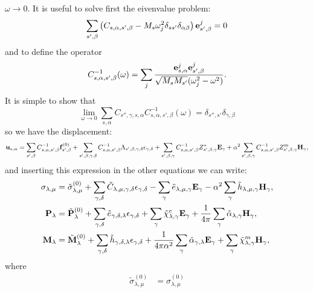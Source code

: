 \documentclass[12pt,a4paper]{article}
\begin{document}
{$\omega \rightarrow 0$.
It is useful to solve first the eivenvalue problem:
\begin{equation}
\sum_{s',\beta} \left(C_{s,\alpha,s',\beta} - 
M_s \omega_j^2 \delta_{ss'}\delta_{\alpha\beta}\right){\bf e}^j_{s',\beta}=0
\end{equation}
and to define the operator
\begin{equation}
C^{-1}_{s,\alpha,s',\beta}(\omega) = \sum_j {{\bf e}^j_{s,\alpha} {\bf e}^j_{s',\beta}
\over \sqrt{M_s M_{s'}}(\omega^2_j - \omega^2)}.
\end{equation}
It is simple to show that
\begin{equation}
\lim_{\omega\rightarrow 0} \sum_{s,\alpha} C_{s'',\gamma,s,\alpha} C^{-1}_{s,\alpha,s',\beta}(\omega)
=\delta_{s'',s'} \delta_{\gamma,\beta}
\end{equation}
so we have the displacement:
\begin{equation}
{\bf u}_{s,\alpha}=\sum_{s',\beta} C^{-1}_{s,\alpha,s',\beta}
{\bf f}^{(0)}_{s',\beta} + \sum_{s',\beta,\gamma,\delta} 
C^{-1}_{s,\alpha,s',\beta}
\Lambda_{s',\beta,\gamma,\delta} \epsilon_{\gamma,\delta}
+ \sum_{s',\beta,\gamma} C^{-1}_{s,\alpha,s',\beta}
Z^*_{s',\beta,\gamma} {\bf E}_{\gamma} 
+ \alpha^2 \sum_{s',\beta,\gamma} C^{-1}_{s,\alpha,s',\beta} 
Z^m_{s',\beta,\gamma} 
{\bf H}_{\gamma},
\end{equation}
and inserting this expression in the other equations we can write:
\begin{align}
\sigma_{\lambda,\mu}&= \tilde \sigma_{\lambda,\mu}^{(0)}
+\sum_{\gamma,\delta} \tilde C_{\lambda,\mu,\gamma,\delta}  
\epsilon_{\gamma,\delta} -
\sum_{\gamma} \tilde e_{\lambda,\mu,\gamma} 
 {\bf E}_{\gamma}
-\alpha^2 \sum_{\gamma}  \tilde h_{\lambda,\mu,\gamma} 
{\bf H}_{\gamma}, \\
{\bf P}_{\lambda}&= \tilde {\bf P}^{(0)}_{\lambda}
+\sum_{\gamma,\delta} \tilde e_{\gamma,\delta,\lambda} 
\epsilon_{\gamma,\delta} +
\sum_{\gamma} 
\tilde \chi^e_{\lambda,\gamma}
{\bf E}_{\gamma} +
{1\over 4 \pi}\sum_{\gamma} \tilde \alpha_{\lambda,\gamma} 
{\bf H}_{\gamma}, \\
{\bf M}_{\lambda}&= \tilde {\bf M}^{(0)}_{\lambda}
+\sum_{\gamma,\delta}  \tilde h_{\gamma,\delta,\lambda} 
\epsilon_{\gamma,\delta} 
+{1\over 4 \pi \alpha^2} \sum_{\gamma} \tilde \alpha_{\gamma,\lambda} 
{\bf E}_{\gamma}
+\sum_{\gamma} 
\tilde \chi^m_{\lambda,\gamma}
{\bf H}_{\gamma},
\end{align}
where 
\begin{align}
\tilde \sigma^{(0)}_{\lambda,\mu}&= \sigma^{(0)}_{\lambda,\mu}

\end{align}}
\end{document}
